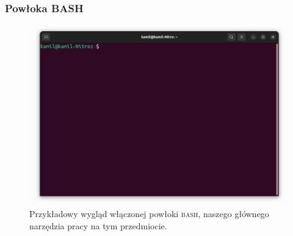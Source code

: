 \documentclass[10pt,t]{beamer}
\begin{document}
\begin{frame}
  \frametitle{Powłoka BASH}

  \vspace{-0.5em}


  \begin{figure}

    \label{fig:BASH-shell}

    \centering


    \includegraphics[scale=0.23]
    {./Presentations-pictures/Miscancellous-pictures/BASH-shell.png}


    \caption{Przykładowy wygląd włączonej powłoki \textsc{bash}, naszego
      głównego narzędzia pracy na tym przedmiocie.}

  \end{figure}

\end{frame}
\end{document}
